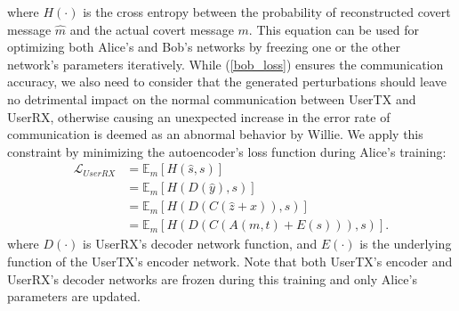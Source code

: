 where \(H(\cdot)\) is the cross entropy between the probability of reconstructed covert message \(\hat{m}\) and the actual covert message \(m\). This equation can be used for optimizing both Alice's and Bob's networks by freezing one or the other network's parameters iteratively. While (\ref{bob_loss}) ensures the communication accuracy, we also need to consider that the generated perturbations should leave no detrimental impact on the normal communication between UserTX and UserRX, otherwise causing an unexpected increase in the error rate of communication is deemed as an abnormal behavior by Willie. We apply this constraint by minimizing the autoencoder's loss function during Alice's training:
\begin{equation}
	\begin{aligned} \label{alice_user_loss}
	\mathcal{L}_{UserRX} & = \mathbb{E}_{m}[H(\hat{s}, s)] \\
	& = \mathbb{E}_{m}[H(D(\hat{y}), s)] \\
	& = \mathbb{E}_{m}[H(D(C(\hat{z} + x)), s)] \\
	& = \mathbb{E}_{m}[H(D(C(A(m, t) + E(s))), s)].
	\end{aligned}
\end{equation}
where \(D(\cdot)\) is UserRX's decoder network function, and \(E(\cdot)\) is the underlying function of the UserTX's encoder network. Note that both UserTX's encoder and UserRX's decoder networks are frozen during this training and only Alice's parameters are updated.


